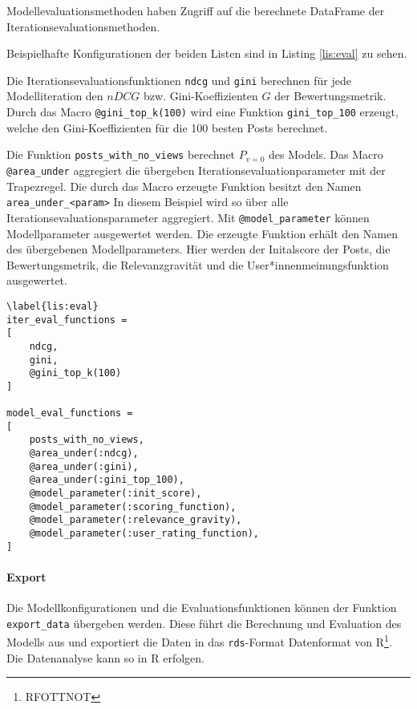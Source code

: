 Modellevaluationsmethoden haben Zugriff auf die berechnete DataFrame der Iterationsevaluationsmethoden.

Beispielhafte Konfigurationen der beiden Listen sind in Listing \ref{lis:eval} zu sehen. 

Die Iterationsevaluationsfunktionen \texttt{ndcg} und \texttt{gini} berechnen für jede Modelliteration den $nDCG$ bzw. Gini-Koeffizienten $G$ der Bewertungsmetrik. Durch das Macro \texttt{@gini\_top\_k(100)} wird eine Funktion \texttt{gini\_top\_100} erzeugt, welche den Gini-Koeffizienten für die 100 besten Posts berechnet.

Die Funktion \texttt{posts\_with\_no\_views} berechnet $P_{v = 0}$ des Models. Das Macro \texttt{@area\_under} aggregiert die übergeben Iterationsevaluationparameter mit der Trapezregel. Die durch das Macro erzeugte Funktion besitzt den Namen \texttt{area\_under\_<param>} In diesem Beispiel wird so über alle Iterationsevaluationsparameter aggregiert. Mit \texttt{@model\_parameter} können Modellparameter ausgewertet werden. Die erzeugte Funktion erhält den Namen des übergebenen Modellparameters. Hier werden der Initalscore der Posts, die Bewertungsmetrik, die Relevanzgravität und die User*innenmeinungsfunktion ausgewertet.


\begin{lstlisting}
\label{lis:eval}
iter_eval_functions = 
[
	ndcg,
	gini,
	@gini_top_k(100)
]

model_eval_functions = 
[
	posts_with_no_views,
	@area_under(:ndcg),
	@area_under(:gini),
	@area_under(:gini_top_100),
	@model_parameter(:init_score),
	@model_parameter(:scoring_function),
	@model_parameter(:relevance_gravity),
	@model_parameter(:user_rating_function),
]
\end{lstlisting}

\paragraph{Export}
Die Modellkonfigurationen und die Evaluationsfunktionen können der Funktion \texttt{export\_data} übergeben werden. Diese führt die Berechnung und Evaluation des Modells aus und exportiert die Daten in das \texttt{rds}-Format Datenformat von R\footnote{RFOTTNOT}. Die Datenanalyse kann so in R erfolgen.



